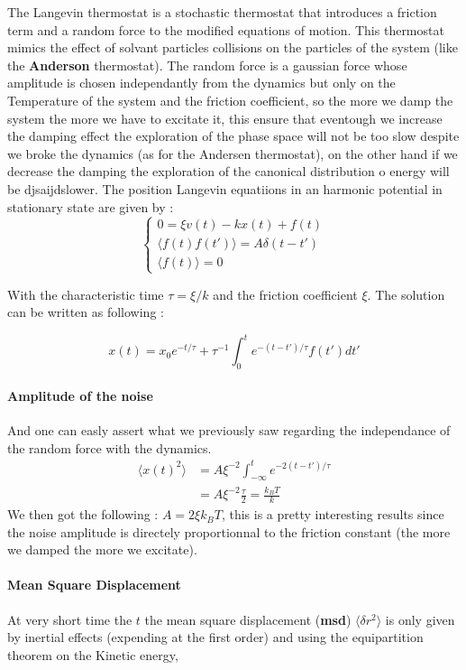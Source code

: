 \documentclass[ansiapaper]{report}
\begin{document}
\begin{multicols}{3}
The Langevin thermostat is a stochastic thermostat that introduces a friction term and a random force to the modified equations of motion. This thermostat mimics the effect of solvant particles collisions on the particles of the system (like the \textbf{Anderson} thermostat). The random force is a gaussian force whose amplitude is chosen independantly from the dynamics but only on the Temperature of the system and the friction coefficient, so the more we damp the system the more we have to excitate it, this ensure that eventough we increase the damping effect the exploration of the phase space will not be too slow despite we broke the dynamics (as for the Andersen thermostat), on the other hand if we decrease the damping the exploration of the canonical distribution o energy will be djsaijdslower.  The position Langevin equatiions in an harmonic potential in stationary state are given by : 
$$
\begin{cases} 
0 = \xi v(t) - kx(t) + f(t)\\
\langle f(t)f(t')\rangle = A \delta(t - t')\\
\langle f(t)\rangle = 0
\end{cases} 
$$

With the characteristic time $\tau = \xi/k$ and the friction coefficient $\xi$. The solution can be written as following : 

$$ x(t) = x_0 e^{-t/\tau} + \tau^{-1}\int_{0}^{t}e^{-(t - t') / \tau} f(t')dt'$$

\paragraph*{Amplitude of the noise}
And one can easly assert what we previously saw regarding the independance of the random force with the dynamics.
\begin{align*}
    \langle x(t)^2 \rangle &= A \xi^{-2} \int_{-\infty}^{t} e^{-2(t - t')/\tau}    \\                     
                           &= A \xi^{-2} \frac{\tau}{2} = \frac{k_B T}{k} 
\end{align*}
We then got the following : $A = 2 \xi k_B T $, this is a pretty interesting results since the noise amplitude is directely proportionnal to the friction constant (the more we damped the more we excitate).
\paragraph*{Mean Square Displacement}
At very short time the $t$ the mean square displacement (\textbf{msd}) $\langle \delta r^2\rangle$ is only given by inertial effects (expending at the first order) and using the equipartition theorem on the Kinetic energy, 


\end{multicols}
\end{document}
